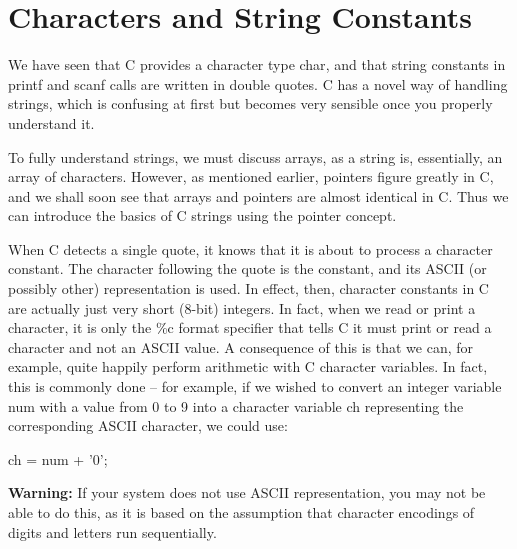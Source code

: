 \section{Characters and String Constants}

     We have  seen that  C provides  a character  type {\cd char}, 
and that  string constants in  {\cd printf} and  {\cd scanf} calls
are written  in double  quotes. C has a novel way  of handling 
strings, which  is confusing at first but becomes very sensible once
you properly understand it.

     To fully  understand strings,  we must  discuss arrays,  as a 
string is, essentially, an  array of  characters. However, as
mentioned earlier, pointers figure greatly in C, and we shall soon
see that arrays and pointers are almost identical in  C. Thus  we
can  introduce the  basics of  C strings  using  the pointer concept.

     When C  detects a  single quote,  it knows  that it is about to
process a character constant. The character following the quote is
the constant, and its ASCII (or  possibly other)  representation is
used. In effect, then, character constants in C are actually just
very short (8-bit) integers. In fact, when we read or  print a
character, it is only the {\cd \%c} format specifier that tells C it
must print  or read a character and not an ASCII value. A consequence
of this is that we can, for example, quite happily perform arithmetic
with C character variables. In  fact, this  is commonly  done --  for
example,  if we  wished to convert an  integer variable  {\cd num}
with  a value  from 0  to 9 into a character variable {\cd ch}
representing the corresponding ASCII character, we could use:
\begin{code}
 ch = num + '0';
\end{code}
\noindent
     {\bf Warning:} If  your system  does not use ASCII
representation, you may not be able  to do this, as it is based on
the assumption that character encodings of digits and letters run
sequentially.

